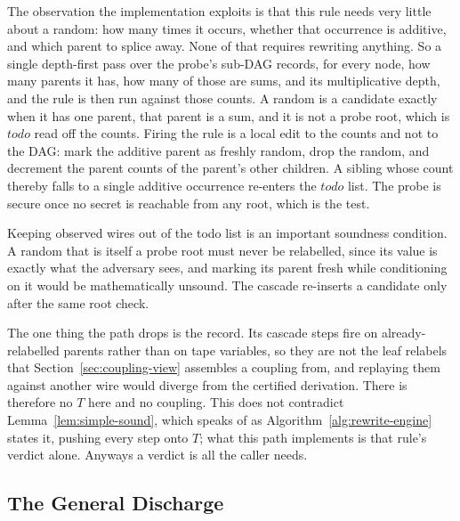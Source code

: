   The observation the implementation exploits is that this rule needs very little
  about a random: how many times it occurs, whether that occurrence is additive,
  and which parent to splice away. None of that requires rewriting anything. So a
  single depth-first pass over the probe's sub-DAG records, for every node, how
  many parents it has, how many of those are sums, and its multiplicative depth,
  and the rule is then run against those counts. A random is a candidate exactly
  when it has one parent, that parent is a sum, and it is not a probe root, which
  is $\mathit{todo}$ read off the counts. Firing the rule is a local edit to the
  counts and not to the DAG: mark the additive parent as freshly random, drop the
  random, and decrement the parent counts of the parent's other children. A sibling
  whose count thereby falls to a single additive occurrence re-enters the
  $\mathit{todo}$ list. The probe is
  secure once no secret is reachable from any root, which is the
   test.

  Keeping observed wires out of the todo list is an important soundness condition.
  A random that is itself a probe root must never be relabelled,
  since its value is exactly what the adversary sees, and marking its parent fresh
  while conditioning on it would be mathematically unsound. The
  cascade re-inserts a candidate only after the same root check.

  The one thing the path drops is the record. Its cascade steps fire on
  already-relabelled parents rather than on tape variables, so they are not the
  leaf relabels that Section~\ref{sec:coupling-view} assembles a coupling from, and
  replaying them against another wire would diverge from the certified derivation.
  There is therefore no $T$ here and no coupling. This does not contradict
  Lemma~\ref{lem:simple-sound}, which speaks of  as
  Algorithm~\ref{alg:rewrite-engine} states it, pushing every step onto $T$; what
  this path implements is that rule's verdict alone. Anyways a verdict is all the
  caller needs.

  \subsection{The General Discharge}
  \label{sec:findrule-impl}

